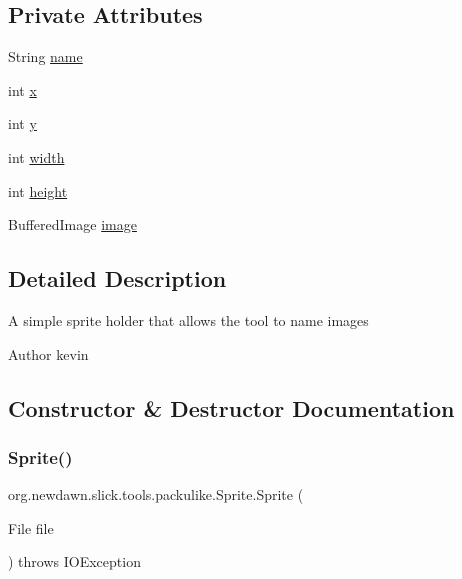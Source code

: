 \subsection*{Private Attributes}
\begin{DoxyCompactItemize}
\item 
String \mbox{\hyperlink{classorg_1_1newdawn_1_1slick_1_1tools_1_1packulike_1_1_sprite_a8cad2e7ed5b25766e5b16d76a96ce831}{name}}
\item 
int \mbox{\hyperlink{classorg_1_1newdawn_1_1slick_1_1tools_1_1packulike_1_1_sprite_a9bd0b6392ca72a997c8bbd9631fb6dab}{x}}
\item 
int \mbox{\hyperlink{classorg_1_1newdawn_1_1slick_1_1tools_1_1packulike_1_1_sprite_a513b034525fe70842f69ff900ab3783a}{y}}
\item 
int \mbox{\hyperlink{classorg_1_1newdawn_1_1slick_1_1tools_1_1packulike_1_1_sprite_a4246c9fcd258ce9268d69532b384c977}{width}}
\item 
int \mbox{\hyperlink{classorg_1_1newdawn_1_1slick_1_1tools_1_1packulike_1_1_sprite_a33d551a688d84bce77065b00c4309eab}{height}}
\item 
Buffered\+Image \mbox{\hyperlink{classorg_1_1newdawn_1_1slick_1_1tools_1_1packulike_1_1_sprite_a021954101cf2a5afc580af29559ab4e5}{image}}
\end{DoxyCompactItemize}


\subsection{Detailed Description}
A simple sprite holder that allows the tool to name images

\begin{DoxyAuthor}{Author}
kevin 
\end{DoxyAuthor}


\subsection{Constructor \& Destructor Documentation}
\mbox{\label{classorg_1_1newdawn_1_1slick_1_1tools_1_1packulike_1_1_sprite_a9ff192e45876e68fe79a7ec2b5639434}} 
\subsubsection{\texorpdfstring{Sprite()}{Sprite()}\hspace{0.1cm}{\footnotesize\ttfamily [1/2]}}
{\footnotesize\ttfamily org.\+newdawn.\+slick.\+tools.\+packulike.\+Sprite.\+Sprite (\begin{DoxyParamCaption}\item[{File}]{file }\end{DoxyParamCaption}) throws I\+O\+Exception\hspace{0.3cm}{\ttfamily [inline]}}

